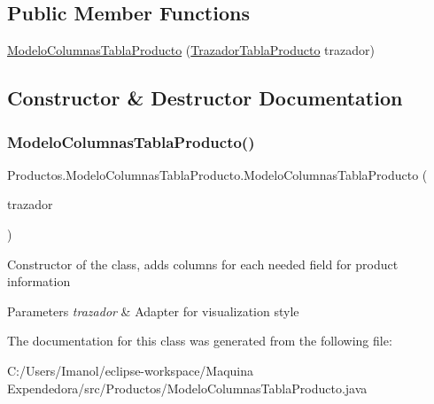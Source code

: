 \subsection*{Public Member Functions}
\begin{DoxyCompactItemize}
\item 
\mbox{\hyperlink{class_productos_1_1_modelo_columnas_tabla_producto_a241bca4777bb26a26f8c0bb78049f2b0}{Modelo\+Columnas\+Tabla\+Producto}} (\mbox{\hyperlink{class_productos_1_1_trazador_tabla_producto}{Trazador\+Tabla\+Producto}} trazador)
\end{DoxyCompactItemize}


\subsection{Constructor \& Destructor Documentation}
\mbox{\label{class_productos_1_1_modelo_columnas_tabla_producto_a241bca4777bb26a26f8c0bb78049f2b0}} 
\subsubsection{\texorpdfstring{Modelo\+Columnas\+Tabla\+Producto()}{ModeloColumnasTablaProducto()}}
{\footnotesize\ttfamily Productos.\+Modelo\+Columnas\+Tabla\+Producto.\+Modelo\+Columnas\+Tabla\+Producto (\begin{DoxyParamCaption}\item[{\mbox{\hyperlink{class_productos_1_1_trazador_tabla_producto}{Trazador\+Tabla\+Producto}}}]{trazador }\end{DoxyParamCaption})}

Constructor of the class, adds columns for each needed field for product information 
\begin{DoxyParams}{Parameters}
{\em trazador} & Adapter for visualization style \\
\hline
\end{DoxyParams}


The documentation for this class was generated from the following file\+:\begin{DoxyCompactItemize}
\item 
C\+:/\+Users/\+Imanol/eclipse-\/workspace/\+Maquina Expendedora/src/\+Productos/Modelo\+Columnas\+Tabla\+Producto.\+java\end{DoxyCompactItemize}
